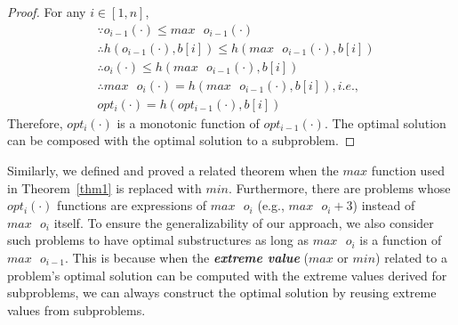 \begin{proof}
For any $i\in[1, n]$, 
\begin{align}
    &\because o_{i-1}(\cdot) \le max \text{ }o_{i-1}(\cdot) \nonumber\\
    & \therefore h(o_{i-1}(\cdot), b[i])\le h(max \text{ }o_{i-1}(\cdot), b[i]) \nonumber\\
     &\therefore o_i(\cdot) \le h(max \text{ }o_{i-1}(\cdot), b[i])\nonumber\\ %
     &\therefore max\text{ }o_i(\cdot)=h(max \text{ }o_{i-1}(\cdot), b[i]), i.e.,  \nonumber \\
     & opt_i(\cdot)=h(opt_{i-1}(\cdot), b[i]) \nonumber
\end{align}
Therefore, $opt_i(\cdot)$ is a monotonic function of $opt_{i-1}(\cdot)$. The optimal solution can be composed with the optimal solution to a subproblem. \qedhere  
\end{proof}

Similarly, we defined and proved a related theorem when the $max$ function used in Theorem~\ref{thm1} is replaced with $min$. Furthermore, there are problems whose $opt_i(\cdot)$ functions are expressions of $max\text{ }o_i$ (e.g., $max\text{ }o_i+3$) instead of $max\text{ }o_i$ itself. 
To ensure the generalizability of our approach, we also consider such problems 
to have optimal substructures as long as $max\text{ }o_i$ is a function of $max\text{ }o_{i-1}$. 
This is because when the \textbf{\emph{extreme value}} ($max$ or $min$) related to a problem's optimal solution can be computed 
with the extreme values derived for subproblems,
we can always construct the optimal solution by reusing extreme values from subproblems. 

